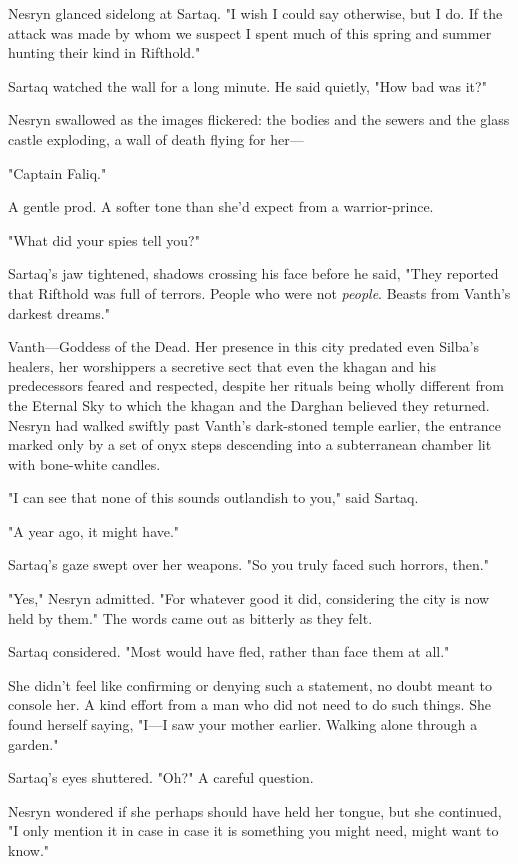 Nesryn glanced sidelong at Sartaq. "I wish I could say otherwise, but I do. If the attack was made by whom we suspect  I spent much of this spring and summer hunting their kind in Rifthold."

Sartaq watched the wall for a long minute. He said quietly, "How bad was it?"

Nesryn swallowed as the images flickered: the bodies and the sewers and the glass castle exploding, a wall of death flying for her---

"Captain Faliq."

A gentle prod. A softer tone than she'd expect from a warrior-prince.

"What did your spies tell you?"

Sartaq's jaw tightened, shadows crossing his face before he said, "They reported that Rifthold was full of terrors. People who were not
\emph{people}. Beasts from Vanth's darkest dreams."

Vanth---Goddess of the Dead. Her presence in this city predated even Silba's healers, her worshippers a secretive sect that even the khagan and his predecessors feared and respected, despite her rituals being wholly different from the Eternal Sky to which the khagan and the Darghan believed they returned. Nesryn had walked swiftly past Vanth's dark-stoned temple earlier, the entrance marked only by a set of onyx steps descending into a subterranean chamber lit with bone-white candles.

"I can see that none of this sounds outlandish to you," said Sartaq.

"A year ago, it might have."

Sartaq's gaze swept over her weapons. "So you truly faced such horrors, then."

"Yes," Nesryn admitted. "For whatever good it did, considering the city is now held by them." The words came out as bitterly as they felt.

Sartaq considered. "Most would have fled, rather than face them at all."

She didn't feel like confirming or denying such a statement, no doubt meant to console her. A kind effort from a man who did not need to do such things. She found herself saying, "I---I saw your mother earlier. Walking alone through a garden."

Sartaq's eyes shuttered. "Oh?" A careful question.

Nesryn wondered if she perhaps should have held her tongue, but she continued, "I only mention it in case  in case it is something you might need, might want to know."

